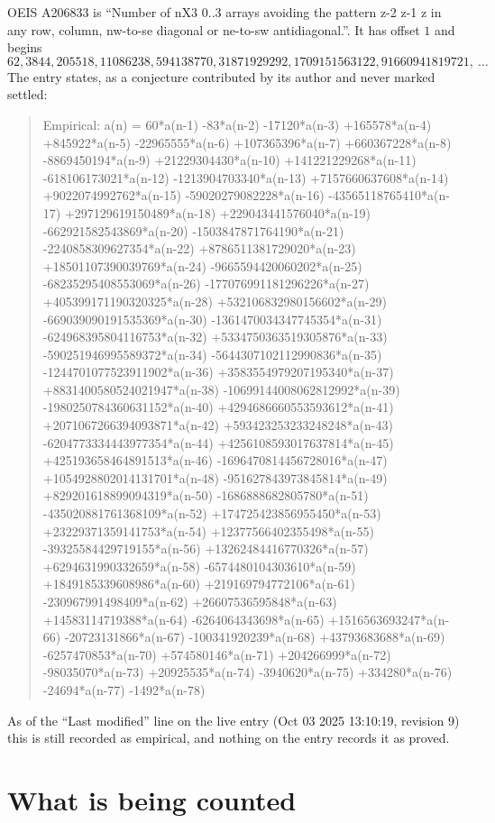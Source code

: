 \documentclass[11pt,a4paper]{article}
\theoremstyle{plain}
\theoremstyle{definition}
\begin{document}
OEIS A206833 is ``Number of nX3 0..3 arrays avoiding the pattern z-2 z-1 z in any row, column, nw-to-se diagonal or ne-to-sw antidiagonal.''. It has offset $1$ and begins
\[
62, 3844, 205518, 11086238, 594138770, 31871929292, 1709151563122, 91660941819721,\ \dots
\]
The entry states, as a conjecture contributed by its author and never marked settled:
\begin{quote}
Empirical: a(n) = 60*a(n-1) -83*a(n-2) -17120*a(n-3) +165578*a(n-4) +845922*a(n-5) -22965555*a(n-6) +107365396*a(n-7) +660367228*a(n-8) -8869450194*a(n-9) +21229304430*a(n-10) +141221229268*a(n-11) -618106173021*a(n-12) -1213904703340*a(n-13) +7157660637608*a(n-14) +9022074992762*a(n-15) -59020279082228*a(n-16) -43565118765410*a(n-17) +297129619150489*a(n-18) +229043441576040*a(n-19) -662921582543869*a(n-20) -1503847871764190*a(n-21) -2240858309627354*a(n-22) +8786511381729020*a(n-23) +18501107390039769*a(n-24) -9665594420060202*a(n-25) -68235295408553069*a(n-26) -177076991181296226*a(n-27) +405399171190320325*a(n-28) +532106832980156602*a(n-29) -669039090191535369*a(n-30) -1361470034347745354*a(n-31) -624968395804116753*a(n-32) +5334750363519305876*a(n-33) -590251946995589372*a(n-34) -5644307102112990836*a(n-35) -1244701077523911902*a(n-36) +3583554979207195340*a(n-37) +8831400580524021947*a(n-38) -10699144008062812992*a(n-39) -1980250784360631152*a(n-40) +4294686660553593612*a(n-41) +2071067266394093871*a(n-42) +593423253233248248*a(n-43) -6204773334443977354*a(n-44) +4256108593017637814*a(n-45) +425193658464891513*a(n-46) -1696470814456728016*a(n-47) +1054928802014131701*a(n-48) -951627843973845814*a(n-49) +829201618899094319*a(n-50) -1686888682805780*a(n-51) -435020881761368109*a(n-52) +174725423856955450*a(n-53) +23229371359141753*a(n-54) +12377566402355498*a(n-55) -39325584429719155*a(n-56) +13262484416770326*a(n-57) +6294631990332659*a(n-58) -6574480104303610*a(n-59) +1849185339608986*a(n-60) +219169794772106*a(n-61) -230967991498409*a(n-62) +26607536595848*a(n-63) +14583114719388*a(n-64) -6264064343698*a(n-65) +1516563693247*a(n-66) -20723131866*a(n-67) -100341920239*a(n-68) +43793683688*a(n-69) -6257470853*a(n-70) +574580146*a(n-71) +204266999*a(n-72) -98035070*a(n-73) +20925535*a(n-74) -3940620*a(n-75) +334280*a(n-76) -24694*a(n-77) -1492*a(n-78)
\end{quote}
As of the ``Last modified'' line on the live entry (Oct 03 2025 13:10:19, revision 9) this is still
recorded as empirical, and nothing on the entry records it as proved.

\section{What is being counted}
\end{document}
